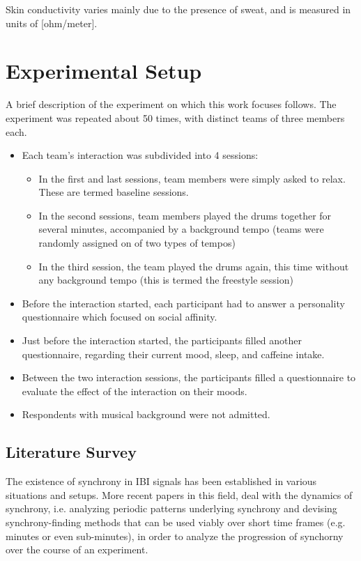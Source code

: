 \documentclass[a4paper, 11pt]{article}      %
\begin{document}
Skin conductivity varies mainly due to the presence of sweat, and is measured in units of [ohm\slash meter].

\section{Experimental Setup}
A brief description of the experiment on which this work focuses follows. The experiment was repeated about 50 times, with distinct teams of three members each.
\begin{itemize}
    \item Each team's interaction was subdivided into 4 sessions:
    \begin{itemize}
        \item In the first and last sessions, team members were simply asked to relax. These are termed baseline sessions.
        \item In the second sessions, team members played the drums together for several minutes, accompanied by a background tempo (teams were randomly assigned on of two types of tempos)
        \item In the third session, the team played the drums again, this time without any background tempo (this is termed the freestyle session) 
    \end{itemize}
    \item Before the interaction started, each participant had to answer a personality questionnaire which focused on social affinity.
    \item Just before the interaction started, the participants filled another questionnaire, regarding their current mood, sleep, and caffeine intake.
    \item Between the two interaction sessions, the participants filled a questionnaire to evaluate the effect of the interaction on their moods.
    \item Respondents with musical background were not admitted.
\end{itemize}

\subsection{Literature Survey}
The existence of synchrony in IBI signals has been established in various situations and setups. More recent papers in this field, deal with the dynamics of synchrony, i.e. analyzing periodic patterns underlying synchrony and devising synchrony-finding methods that can be used viably over short time frames (e.g. minutes or even sub-minutes), in order to analyze the progression of synchorny over the course of an experiment. 
\end{document}
